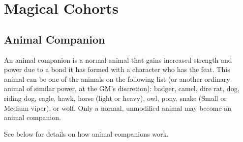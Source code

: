 \section{Magical Cohorts}
\subsection{Animal Companion}
\label{sec:AnimalCompanion}
An animal companion is a normal animal that gains increased strength and power due to a bond it has formed with a character
who has the  feat. 
This animal can be one of the animals on the following list (or another ordinary animal of similar power, at the GM's discretion):
badger, camel, dire rat, dog, riding dog, eagle, hawk, horse (light or heavy), owl, pony, snake (Small or Medium viper), or wolf.
Only a normal, unmodified animal may become an animal companion.

See below for details on how animal companions work.
